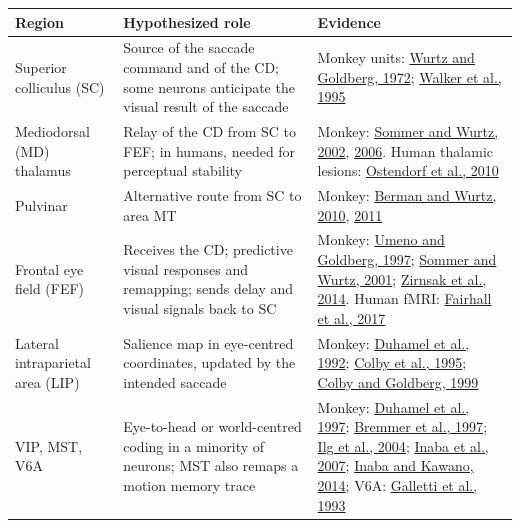 \documentclass[11pt,a4paper]{article}
\begin{document}
{\footnotesize\setlength{\tabcolsep}{3pt}
\begin{longtable}{>{\raggedright\arraybackslash}p{2.94cm}>{\raggedright\arraybackslash}p{4.78cm}>{\raggedright\arraybackslash}p{6.62cm}}
\toprule
\textbf{Region} & \textbf{Hypothesized role} & \textbf{Evidence} \\
\midrule
\endhead
Superior colliculus (SC) & Source of the saccade command and of the CD; some neurons anticipate the visual result of the saccade & Monkey units: \href{https://doi.org/10.1152/jn.1972.35.4.575}{Wurtz and Goldberg, 1972}; \href{https://doi.org/10.1152/jn.1995.73.5.1988}{Walker et al., 1995} \\
\addlinespace[2pt]
Mediodorsal (MD) thalamus & Relay of the CD from SC to FEF; in humans, needed for perceptual stability & Monkey: \href{https://doi.org/10.1126/science.1069590}{Sommer and Wurtz, 2002}, \href{https://www.nature.com/articles/nature05279}{2006}. Human thalamic lesions: \href{https://doi.org/10.1073/pnas.0910742107}{Ostendorf et al., 2010} \\
\addlinespace[2pt]
Pulvinar & Alternative route from SC to area MT & Monkey: \href{https://doi.org/10.1523/JNEUROSCI.6176-09.2010}{Berman and Wurtz, 2010}, \href{https://doi.org/10.1523/JNEUROSCI.4738-10.2011}{2011} \\
\addlinespace[2pt]
Frontal eye field (FEF) & Receives the CD; predictive visual responses and remapping; sends delay and visual signals back to SC & Monkey: \href{https://doi.org/10.1152/jn.1997.78.3.1373}{Umeno and Goldberg, 1997}; \href{https://doi.org/10.1152/jn.2001.85.4.1673}{Sommer and Wurtz, 2001}; \href{https://doi.org/10.1038/nature13149}{Zirnsak et al., 2014}. Human fMRI: \href{https://www.sciencedirect.com/science/article/pii/S1053811916306899}{Fairhall et al., 2017} \\
\addlinespace[2pt]
Lateral intraparietal area (LIP) & Salience map in eye-centred coordinates, updated by the intended saccade & Monkey: \href{https://www.science.org/doi/10.1126/science.1553535}{Duhamel et al., 1992}; \href{https://doi.org/10.1093/cercor/5.5.470}{Colby et al., 1995}; \href{https://www.annualreviews.org/doi/10.1146/annurev.neuro.22.1.319}{Colby and Goldberg, 1999} \\
\addlinespace[2pt]
VIP, MST, V6A & Eye-to-head or world-centred coding in a minority of neurons; MST also remaps a motion memory trace & Monkey: \href{https://www.nature.com/articles/39865}{Duhamel et al., 1997}; \href{https://doi.org/10.1152/jn.1997.77.2.944}{Bremmer et al., 1997}; \href{https://www.sciencedirect.com/science/article/pii/S0896627304003319}{Ilg et al., 2004}; \href{https://doi.org/10.1152/jn.01054.2006}{Inaba et al., 2007}; \href{https://doi.org/10.1073/pnas.1401370111}{Inaba and Kawano, 2014}; V6A: \href{https://doi.org/10.1007/BF00227102}{Galletti et al., 1993} \\

\end{longtable}}
\end{document}
